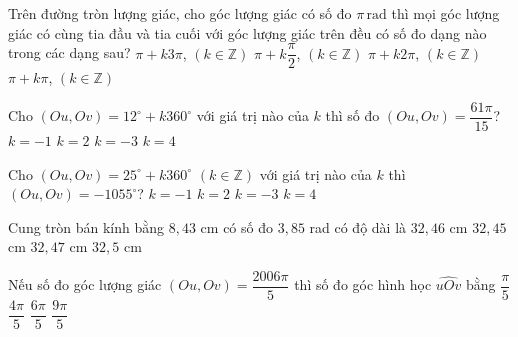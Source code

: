 \begin{ex}%
	Trên đường tròn lượng giác, cho góc lượng giác có số đo $\pi \, \mathrm{rad}$ thì mọi góc lượng giác có cùng tia đầu và tia cuối với góc lượng  giác trên đều có số đo dạng nào trong các dạng sau?
	 \choice
		{$\pi + k3\pi$, $\left(k  \in \mathbb{Z}\right)$}
		{$\pi + k\dfrac{\pi}{2}$, $\left(k \in \mathbb{Z}\right)$} 
		{\True $\pi +  k2\pi$, $\left(k \in \mathbb{Z}\right)$}
		 {$\pi + k\pi$, $\left(k \in \mathbb{Z}\right)$}
\end{ex}

\begin{ex}%
	Cho $(Ou, Ov)=12^{\circ}+k 360^{\circ}$ với giá trị nào của $k$  thì số đo $(Ou, Ov)=\dfrac{61\pi}{15}$?
	 \choice
		 {$k=-1$}
		{\True $k=2$} 
		{$k=-3$} 
		 {$k=4$}
\end{ex}

\begin{ex}%
	 Cho $(Ou, Ov)=25^{\circ}+k 360^{\circ}$ $(k \in \mathbb{Z})$ với giá trị nào của $k$ thì $(Ou, Ov)=-1055^{\circ}$?
	\choice 
		 {$k=-1$}
		 {$k=2$}
		{\True  $k=-3$}
		{$k=4$} 
\end{ex}

\begin{ex}%
	Cung tròn bán kính bằng $8{,}43$ cm có số đo $3{,}85$ rad có độ dài  là
	 \choice
		{\True $32{,}46$  cm}
		{$32{,}45$ cm} 
		{$32{,}47$  cm}
		{$32{,}5$  cm}
\end{ex}

\begin{ex}%
	Nếu số đo  góc lượng giác $(Ou, Ov)=\dfrac{2006\pi}{5}$ thì số đo góc hình học $\widehat{uOv}$ bằng
	\choice 
		 {$\dfrac{\pi}{5}$}
		 {$\dfrac{4\pi}{5}$}
		 {\True $\dfrac{6\pi}{5}$}
		 {$\dfrac{9\pi}{5}$}
\end{ex}

